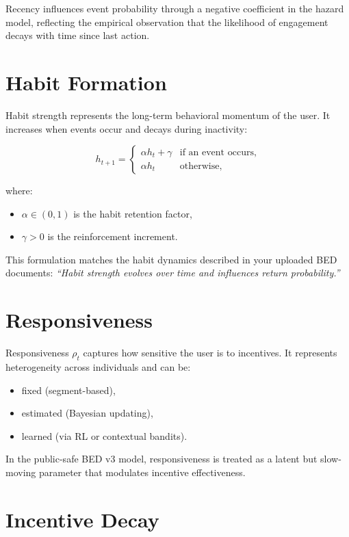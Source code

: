 Recency influences event probability through a negative coefficient in the
hazard model, reflecting the empirical observation that the likelihood of
engagement decays with time since last action.

\section{Habit Formation}

Habit strength represents the long-term behavioral momentum of the user. It
increases when events occur and decays during inactivity:


\[
h_{t+1} =
\begin{cases}
\alpha h_t + \gamma & \text{if an event occurs}, \\
\alpha h_t & \text{otherwise},
\end{cases}
\]


where:
\begin{itemize}
    \item $\alpha \in (0,1)$ is the habit retention factor,
    \item $\gamma > 0$ is the reinforcement increment.
\end{itemize}

This formulation matches the habit dynamics described in your uploaded BED
documents:
\textit{“Habit strength evolves over time and influences return probability.”}

\section{Responsiveness}

Responsiveness $\rho_t$ captures how sensitive the user is to incentives. It
represents heterogeneity across individuals and can be:
\begin{itemize}
    \item fixed (segment-based),
    \item estimated (Bayesian updating),
    \item learned (via RL or contextual bandits).
\end{itemize}

In the public-safe BED v3 model, responsiveness is treated as a latent but
slow-moving parameter that modulates incentive effectiveness.

\section{Incentive Decay}


